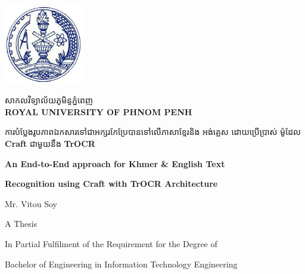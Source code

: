 \begin{titlepage}
    \centering
    \vspace*{1cm}

    \begin{minipage}{0.25\textwidth}
        \includegraphics[width=3.5cm]{figures/RUPP.jpg}
    \end{minipage}
    \hfill
    \begin{minipage}{0.65\textwidth}
        \raggedright
        {\khmerfont\fontsize{16pt}{20pt}\selectfont សាកលវិទ្យាល័យភូមិន្ទភ្នំពេញ\\[0.6em]}
        {\large\bfseries ROYAL UNIVERSITY OF PHNOM PENH}
    \end{minipage}

    \vspace{2cm}

    \begin{minipage}{0.9\textwidth}
        \centering
        {\khmerfont\fontsize{12pt}{20pt}\selectfont ការបំប្លែងរូបភាពឯកសារទៅជាអក្សរកែប្រែបានទៅលើភាសាខ្មែរនិង អង់គ្លេស ដោយប្រើប្រាស់ ម៉ូដែល {\englishfont\textbf{Craft}} ជាមួយនឹង {\englishfont\textbf{TrOCR}}\\[0.4em]}
        {\englishfont\fontsize{15pt}{20pt}\selectfont\bfseries An End-to-End approach for Khmer \& English Text \par}
        {\englishfont\fontsize{15pt}{20pt}\selectfont\bfseries Recognition using Craft with TrOCR Architecture \par}
    \end{minipage}

    \vspace{3.0cm}

    {\englishfont\fontsize{16pt}{20pt}\selectfont Mr. Vitou Soy\par}

    \vspace{3.0cm}

    {\englishfont\fontsize{16pt}{20pt}\selectfont A Thesis\par}
    \vspace{0.5cm}
    {\large In Partial Fulfilment of the Requirement for the Degree of\par}
    {\large Bachelor of Engineering in Information Technology Engineering\par}
    


\end{titlepage}

